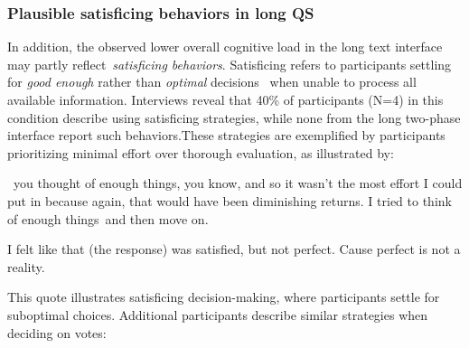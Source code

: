 



\subsubsection{Plausible satisficing behaviors in long QS}
In addition, the observed lower overall cognitive load in the long text interface may partly reflect~\textit{satisficing behaviors}. Satisficing refers to participants settling for \textit{good enough} rather than \textit{optimal} decisions~\cite{gigerenzerReasoningFastFrugal1996} when unable to process all available information. Interviews reveal that 40\% of participants (N=4) in this condition describe using satisficing strategies, while none from the long two-phase interface report such behaviors.These strategies are exemplified by participants prioritizing minimal effort over thorough evaluation, as illustrated by:

\begin{displayquote}
    ~\bracketellipsis you thought of enough things, you know, and so it wasn't the most effort I could put in because again, that would have been diminishing returns. I tried to think of enough things~\bracketellipsis and then move on.~\bracketellipsis 
    
    I felt like that (the response) was satisfied, but not perfect. Cause perfect is not a reality. \hfill{}
\end{displayquote}

This quote illustrates satisficing decision-making, where participants settle for suboptimal choices. Additional participants describe similar strategies when deciding on votes:  

